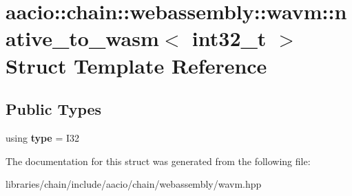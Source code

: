 \hypertarget{structaacio_1_1chain_1_1webassembly_1_1wavm_1_1native__to__wasm_3_01int32__t_01_4}{}\section{aacio\+:\+:chain\+:\+:webassembly\+:\+:wavm\+:\+:native\+\_\+to\+\_\+wasm$<$ int32\+\_\+t $>$ Struct Template Reference}
\label{structaacio_1_1chain_1_1webassembly_1_1wavm_1_1native__to__wasm_3_01int32__t_01_4}
\subsection*{Public Types}
\begin{DoxyCompactItemize}
\item 
\mbox{\label{structaacio_1_1chain_1_1webassembly_1_1wavm_1_1native__to__wasm_3_01int32__t_01_4_ad3694c0bfbc80b68d75c55fc07c20d22}} 
using {\bfseries type} = I32
\end{DoxyCompactItemize}


The documentation for this struct was generated from the following file\+:\begin{DoxyCompactItemize}
\item 
libraries/chain/include/aacio/chain/webassembly/wavm.\+hpp\end{DoxyCompactItemize}
